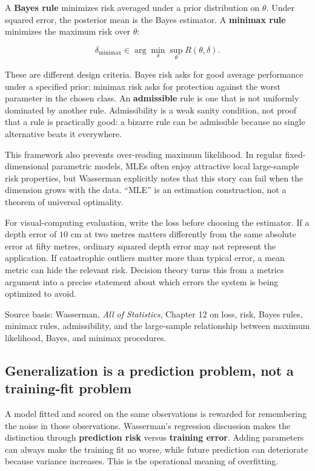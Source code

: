 A \textbf{Bayes rule} minimizes risk averaged under a prior distribution on \(\theta\). Under squared error, the posterior mean is the Bayes estimator. A \textbf{minimax rule} minimizes the maximum risk over \(\theta\):

\[
\delta_{\mathrm{minimax}}
\in
\arg\min_\delta
\sup_{\theta}R(\theta,\delta).
\]

These are different design criteria. Bayes risk asks for good average performance under a specified prior; minimax risk asks for protection against the worst parameter in the chosen class. An \textbf{admissible} rule is one that is not uniformly dominated by another rule. Admissibility is a weak sanity condition, not proof that a rule is practically good: a bizarre rule can be admissible because no single alternative beats it everywhere.

This framework also prevents over-reading maximum likelihood. In regular fixed-dimensional parametric models, MLEs often enjoy attractive local large-sample risk properties, but Wasserman explicitly notes that this story can fail when the dimension grows with the data. ``MLE'' is an estimation construction, not a theorem of universal optimality.

For visual-computing evaluation, write the loss before choosing the estimator. If a depth error of \(10\) cm at two metres matters differently from the same absolute error at fifty metres, ordinary squared depth error may not represent the application. If catastrophic outliers matter more than typical error, a mean metric can hide the relevant risk. Decision theory turns this from a metrics argument into a precise statement about which errors the system is being optimized to avoid.

Source basis: Wasserman, \emph{All of Statistics}, Chapter 12 on loss, risk, Bayes rules, minimax rules, admissibility, and the large-sample relationship between maximum likelihood, Bayes, and minimax procedures.

\subsection{Generalization is a prediction problem, not a training-fit problem}\label{02-foundations-ii-ch030-generalization-is-a-prediction-problem-not-a-training-fit-problem}

\hypertarget{02-foundations-ii-ch030-generalization-is-a-prediction-problem-not-a-training-fit-problem}{}

A model fitted and scored on the same observations is rewarded for remembering the noise in those observations. Wasserman's regression discussion makes the distinction through \textbf{prediction risk} versus \textbf{training error}. Adding parameters can always make the training fit no worse, while future prediction can deteriorate because variance increases. This is the operational meaning of overfitting.

